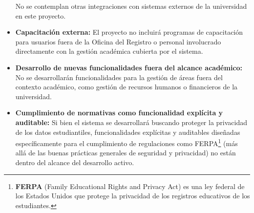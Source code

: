 \begin{itemize}
    No se contemplan otras integraciones con sistemas externos de la universidad en este proyecto.
    \item \textbf{Capacitación externa:} El proyecto no incluirá programas de capacitación para usuarios fuera de la Oficina del Registro o personal involucrado directamente con la gestión académica cubierta por el sistema.
    \item \textbf{Desarrollo de nuevas funcionalidades fuera del alcance académico:} No se desarrollarán funcionalidades para la gestión de áreas fuera del contexto académico, como gestión de recursos humanos o financieros de la universidad.
    \item \textbf{Cumplimiento de normativas como funcionalidad explícita y auditable:} Si bien el sistema se desarrollará buscando proteger la privacidad de los datos estudiantiles, funcionalidades explícitas y auditables diseñadas específicamente para el cumplimiento de regulaciones como FERPA\footnote{\textbf{FERPA} (Family Educational Rights and Privacy Act) es una ley federal de los Estados Unidos que protege la privacidad de los registros educativos de los estudiantes.} (más allá de las buenas prácticas generales de seguridad y privacidad) no están dentro del alcance del desarrollo activo.
\end{itemize}
